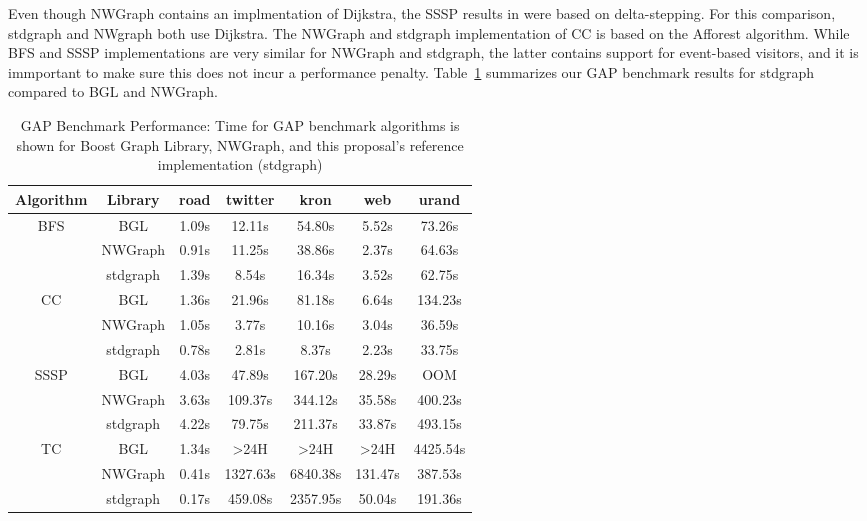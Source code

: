 Even though NWGraph contains an implmentation of Dijkstra, the SSSP results in \cite{REF_nwgraph_library}
were based on delta-stepping. For this comparison, stdgraph and NWgraph both use Dijkstra.
The NWGraph and stdgraph implementation of CC is based on the Afforest \cite{sutton2018optimizing} algorithm.
While BFS and SSSP implementations are very similar for NWGraph and stdgraph, the latter contains
support for event-based visitors, and it is immportant to make sure this does not incur a performance penalty.
Table~\ref{tab:performance_numbers} summarizes our GAP benchmark results for stdgraph compared to BGL and NWGraph.

\begin{table}[h!]
\centering
\begin{tabular}{ c c c c c c c }
Algorithm & Library & road & twitter & kron & web & urand \\
\hline
\multirow{3}{*}{BFS} & BGL & 1.09s & 12.11s & 54.80s & 5.52s & 73.26s \\
& NWGraph & 0.91s & 11.25s & 38.86s & 2.37s & 64.63s \\
& stdgraph & 1.39s & 8.54s & 16.34s & 3.52s & 62.75s \\
\hline
\multirow{3}{*}{CC} & BGL & 1.36s & 21.96s & 81.18s & 6.64s & 134.23s \\
& NWGraph & 1.05s & 3.77s & 10.16s & 3.04s & 36.59s \\
& stdgraph & 0.78s & 2.81s & 8.37s & 2.23s & 33.75s \\
\hline
\multirow{3}{*}{SSSP} & BGL & 4.03s & 47.89s & 167.20s & 28.29s & OOM \\
& NWGraph & 3.63s & 109.37s & 344.12s & 35.58s & 400.23s \\
& stdgraph & 4.22s & 79.75s & 211.37s & 33.87s & 493.15s \\
\hline
\multirow{3}{*}{TC} & BGL & 1.34s & >24H & >24H & >24H & 4425.54s \\
& NWGraph & 0.41s & 1327.63s & 6840.38s & 131.47s & 387.53s \\
& stdgraph & 0.17s & 459.08s & 2357.95s & 50.04s & 191.36s \\
\hline
\end{tabular}
\caption{GAP Benchmark Performance: Time for GAP benchmark algorithms is shown for Boost Graph Library, NWGraph, and this proposal's reference implementation (stdgraph)}
\label{tab:performance_numbers}
\end{table}
